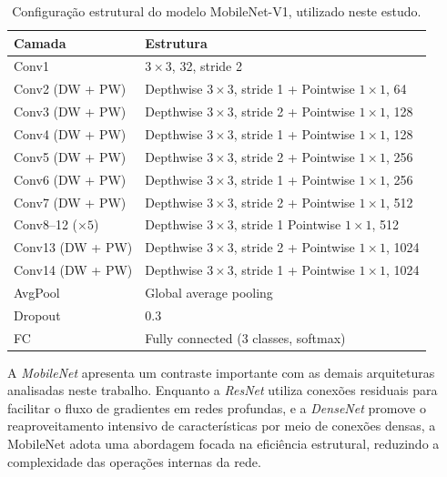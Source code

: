 \begin{table}[h]
	\centering
	\caption{Configuração estrutural do modelo MobileNet-V1, utilizado neste estudo.}
	\label{tab:mobilenet_str}
	\renewcommand{\arraystretch}{1.3}
	
	\begin{tabular}{l|l}
		\toprule
		\textbf{Camada} & \textbf{Estrutura} \\
		\midrule
		
		Conv1 & $3 \times 3$, 32, stride 2 \\        
		Conv2 (DW + PW) & Depthwise $3 \times 3$, stride 1 + Pointwise $1 \times 1$, 64 \\        
		Conv3 (DW + PW) & Depthwise $3 \times 3$, stride 2 + Pointwise $1 \times 1$, 128 \\        
		Conv4 (DW + PW) & Depthwise $3 \times 3$, stride 1 + Pointwise $1 \times 1$, 128 \\        
		Conv5 (DW + PW) & Depthwise $3 \times 3$, stride 2 + Pointwise $1 \times 1$, 256 \\
		Conv6 (DW + PW) & Depthwise $3 \times 3$, stride 1 + Pointwise $1 \times 1$, 256 \\
		Conv7 (DW + PW) & Depthwise $3 \times 3$, stride 2 + Pointwise $1 \times 1$, 512 \\
		
		Conv8--12 ($\times 5$) 
		& \makecell[l]{
			Depthwise $3 \times 3$, stride 1 \\
			Pointwise $1 \times 1$, 512
		}\\
		
		Conv13 (DW + PW) & Depthwise $3 \times 3$, stride 2 + Pointwise $1 \times 1$, 1024 \\
		Conv14 (DW + PW) & Depthwise $3 \times 3$, stride 1 + Pointwise $1 \times 1$, 1024 \\
		
		\midrule
		
		AvgPool & Global average pooling \\ 
		Dropout & 0.3 \\
		FC & Fully connected (3 classes, softmax) \\
		
		\bottomrule
	\end{tabular}
\end{table}

A \textit{MobileNet} apresenta um contraste importante com as demais arquiteturas analisadas neste trabalho. Enquanto a \textit{ResNet} utiliza conexões residuais para facilitar o fluxo de gradientes em redes profundas, e a \textit{DenseNet} promove o reaproveitamento intensivo de características por meio de conexões densas, a MobileNet adota uma abordagem focada na eficiência estrutural, reduzindo a complexidade das operações internas da rede. 

